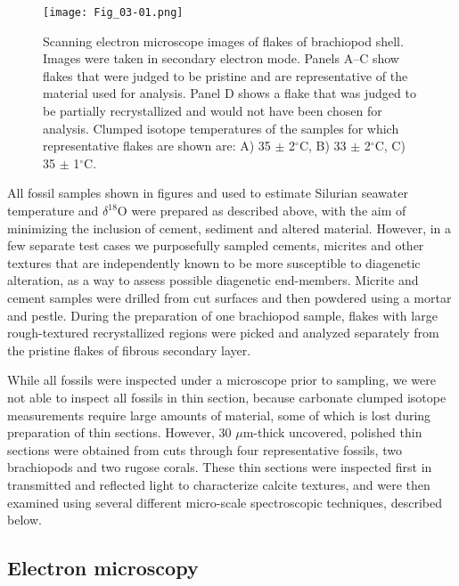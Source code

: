 \documentclass[5p, authoryear]{elsarticle}
\begin{document}
\begin{figure}[tb]
\centering
\texttt{[image: Fig\_03-01.png]}
\caption{Scanning electron microscope images of flakes of brachiopod shell. Images were taken in secondary electron mode. Panels A--C show flakes that were judged to be pristine and are representative of the material used for analysis. Panel D shows a flake that was judged to be partially recrystallized and would not have been chosen for analysis. Clumped isotope temperatures of the samples for which representative flakes are shown are: A) 35 $\pm$ 2$^{\circ}$C, B) 33 $\pm$ 2$^{\circ}$C, C) 35 $\pm$ 1$^{\circ}$C.}
\label{flakes}
\end{figure}

All fossil samples shown in figures and used to estimate Silurian seawater temperature and $\delta^{18}$O  were prepared as described above, with the aim of minimizing the inclusion of cement, sediment and altered material. However, in a few separate test cases we purposefully sampled cements, micrites and other textures that are independently known to be more susceptible to diagenetic alteration, as a way to assess possible diagenetic end-members. Micrite and cement samples were drilled from cut surfaces and then powdered using a mortar and pestle. During the preparation of one brachiopod sample, flakes with large rough-textured recrystallized regions were picked and analyzed separately from the pristine flakes of fibrous secondary layer. 

While all fossils were inspected under a microscope prior to sampling, we were not able to inspect all fossils in thin section, because carbonate clumped isotope measurements require large amounts of material, some of which is lost during preparation of thin sections. However, 30 $\mu$m-thick uncovered, polished thin sections were obtained from cuts through four representative fossils, two brachiopods and two rugose corals. These thin sections were inspected first in transmitted and reflected light to characterize calcite textures, and were then examined using several different micro-scale spectroscopic techniques, described below.  

\subsection{Electron microscopy}
\end{document}
